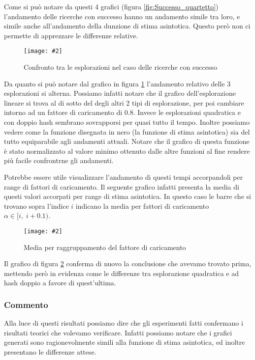 \documentclass{article}
\newcommand{\image}[3][1]{
	\centering
	\texttt{[image: \#2]}
	\caption{#3}
}
\begin{document}
Come si può notare da questi 4 grafici (figura \ref{fig:Successo_quartetto}) l'andamento delle ricerche con successo hanno un andamento simile tra loro, e simile anche all'andamento della dunzione di stima asintotica. Questo però non ci permette di apprezzare le differenze relative.

\begin{figure}[H]
\image[0.75]{Successo_Confronto_Asintotico_scala_logaritmica}{Confronto tra le esplorazioni nel caso delle ricerche con successo}
\label{fig:Successo_Confronto_Asintotico_scala_logaritmica}
\end{figure} 
Da quanto si può notare dal grafico in figura \ref{fig:Successo_Confronto_Asintotico_scala_logaritmica} l'andamento relativo delle 3 esplorazioni si alterna. Possiamo infatti notare che il grafico dell'esplorazione lineare si trova al di sotto del degli altri 2 tipi di esplorazione, per poi cambiare intorno ad un fattore di caricamento di 0.8. Invece le esplorazioni quadratica e con doppio hash sembrano sovrapporsi per quasi tutto il tempo. Inoltre possiamo vedere come la funzione disegnata in nero (la funzione di stima asintotica) sia del tutto equiparabile agli andamenti attuali. Notare che il grafico di questa funzione è stato normalizzato al valore minimo ottenuto dalle altre funzioni al fine rendere più facile confrontrne gli andamenti. 

Potrebbe essere utile visualizzare l'andamento di questi tempi accorpandoli per range di fattori di caricamento. Il seguente grafico infatti presenta la media di questi valori accorpati per range di stima asintotica. In questo caso le barre che si trovano sopra l'indice $i$ indicano la media per fattori di caricamento $\alpha \in [i,\;i+0.1)$.

\begin{figure}[H]
\image[0.75]{Successo_Confronto_barre_scala_logaritmica}{Media per raggruppamento del fattore di caricamento}
\label{fig:Successo_Confronto_barre_scala_logaritmica}
\end{figure}

Il grafico di figura \ref{fig:Successo_Confronto_barre_scala_logaritmica} conferma di nuovo la conclusione che avevamo trovato prima, mettendo però in evidenza come le differenze tra esplorazione quadratica e ad hash doppio a favore di quest'ultima.

\subsubsection{Commento}
Alla luce di questi risultati possiamo dire che gli esperimenti fatti confermano i risultati teorici che volevamo verificare. Infatti possiamo notare che i grafici generati sono ragionevolmente simili alla funzione di stima asintotica, ed inoltre presentano le differenze attese.
\end{document}
